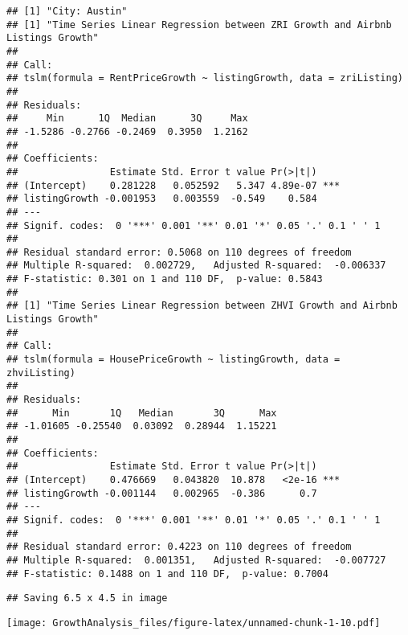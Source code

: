 \documentclass[
]{article}
\begin{document}
\begin{verbatim}
## [1] "City: Austin"
## [1] "Time Series Linear Regression between ZRI Growth and Airbnb Listings Growth"
## 
## Call:
## tslm(formula = RentPriceGrowth ~ listingGrowth, data = zriListing)
## 
## Residuals:
##     Min      1Q  Median      3Q     Max 
## -1.5286 -0.2766 -0.2469  0.3950  1.2162 
## 
## Coefficients:
##                Estimate Std. Error t value Pr(>|t|)    
## (Intercept)    0.281228   0.052592   5.347 4.89e-07 ***
## listingGrowth -0.001953   0.003559  -0.549    0.584    
## ---
## Signif. codes:  0 '***' 0.001 '**' 0.01 '*' 0.05 '.' 0.1 ' ' 1
## 
## Residual standard error: 0.5068 on 110 degrees of freedom
## Multiple R-squared:  0.002729,   Adjusted R-squared:  -0.006337 
## F-statistic: 0.301 on 1 and 110 DF,  p-value: 0.5843
## 
## [1] "Time Series Linear Regression between ZHVI Growth and Airbnb Listings Growth"
## 
## Call:
## tslm(formula = HousePriceGrowth ~ listingGrowth, data = zhviListing)
## 
## Residuals:
##      Min       1Q   Median       3Q      Max 
## -1.01605 -0.25540  0.03092  0.28944  1.15221 
## 
## Coefficients:
##                Estimate Std. Error t value Pr(>|t|)    
## (Intercept)    0.476669   0.043820  10.878   <2e-16 ***
## listingGrowth -0.001144   0.002965  -0.386      0.7    
## ---
## Signif. codes:  0 '***' 0.001 '**' 0.01 '*' 0.05 '.' 0.1 ' ' 1
## 
## Residual standard error: 0.4223 on 110 degrees of freedom
## Multiple R-squared:  0.001351,   Adjusted R-squared:  -0.007727 
## F-statistic: 0.1488 on 1 and 110 DF,  p-value: 0.7004
\end{verbatim}

\begin{verbatim}
## Saving 6.5 x 4.5 in image
\end{verbatim}

\texttt{[image: GrowthAnalysis\_files/figure-latex/unnamed-chunk-1-10.pdf]}
\end{document}
